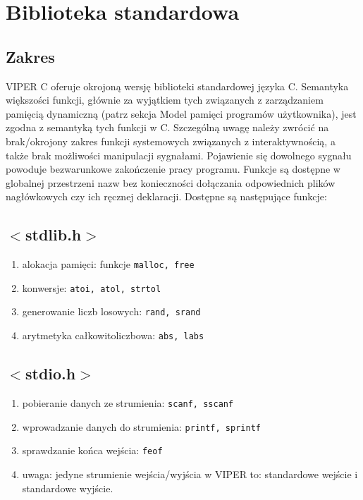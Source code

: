 \documentclass[a4paper,twoside,openright,11pt]{report}
\begin{document}
  \section {Biblioteka standardowa}
  \subsection {Zakres}
  \par VIPER C oferuje okrojoną wersję biblioteki standardowej języka C. Semantyka większości funkcji, głównie za wyjątkiem tych związanych z zarządzaniem pamięcią dynamiczną (patrz sekcja Model pamięci programów użytkownika), jest zgodna z semantyką tych funkcji w C. Szczególną uwagę należy zwrócić na brak/okrojony zakres funkcji systemowych związanych z interaktywnością, a także brak możliwości manipulacji sygnałami. Pojawienie się dowolnego sygnału powoduje bezwarunkowe zakończenie pracy programu. Funkcje są dostępne w globalnej przestrzeni nazw bez konieczności dołączania odpowiednich plików nagłówkowych czy ich ręcznej deklaracji. Dostępne są następujące funkcje:

  \subsection {$<$stdlib.h$>$}
    \begin{enumerate}
      \item alokacja pamięci: funkcje \texttt{malloc, free}
      \item konwersje: \texttt{atoi, atol, strtol}
      \item generowanie liczb losowych: \texttt{rand, srand}
      \item arytmetyka całkowitoliczbowa: \texttt{abs, labs}
    \end{enumerate}
  \subsection {$<$stdio.h$>$}
    \begin{enumerate}
      \item pobieranie danych ze strumienia: \texttt{scanf, sscanf}
      \item wprowadzanie danych do strumienia: \texttt{printf, sprintf}
      \item sprawdzanie końca wejścia: \texttt{feof}
      \item uwaga: jedyne strumienie wejścia/wyjścia w VIPER to: standardowe wejście i standardowe wyjście.
    \end{enumerate}
\end{document}
